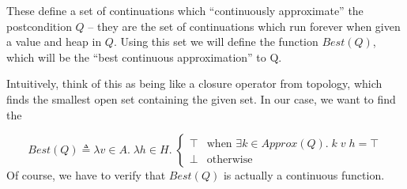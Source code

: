 These define a set of continuations which ``continuously approximate''
the postcondition $Q$ -- they are the set of continuations which run
forever when given a value and heap in $Q$.  Using this set we will
define the function $Best(Q)$, which will be the ``best continuous
approximation'' to Q. 

Intuitively, think of this as being like a closure operator from
topology, which finds the smallest open set containing the given set.
In our case, we want to find the 

\begin{displaymath}
  Best(Q) \triangleq \lambda v \in A.\; \lambda h \in H.\; 
    \left\{\begin{array}{ll}
             \top & \mbox{when } \exists k \in Approx(Q).\; k\;v\;h = \top \\
             \bot & \mbox{otherwise}
           \end{array}
    \right.
\end{displaymath}
Of course, we have to verify that $Best(Q)$ is actually a continuous function. 

